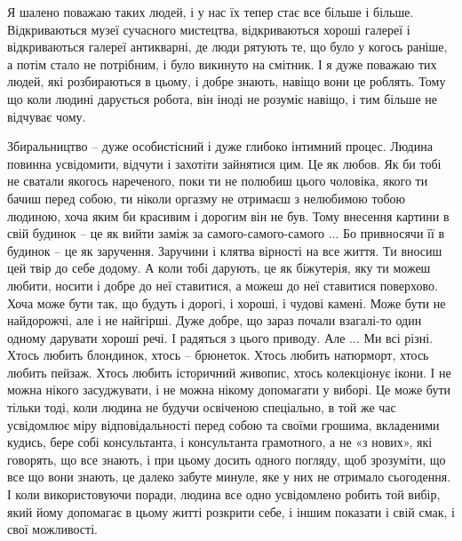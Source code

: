 Я шалено поважаю таких людей, і у нас їх тепер стає все більше і більше.
Відкриваються музеї сучасного мистецтва, відкриваються хороші галереї і
відкриваються галереї антикварні, де люди рятують те, що було у когось раніше,
а потім стало не потрібним, і було викинуто на смітник. І я дуже поважаю тих
людей, які розбираються в цьому, і добре знають, навіщо вони це роблять. Тому
що коли людині дарується робота, він іноді не розуміє навіщо, і тим більше не
відчуває чому.

Збиральництво – дуже особистісний і дуже глибоко інтимний процес. Людина
повинна усвідомити, відчути і захотіти зайнятися цим. Це як любов. Як би тобі
не сватали якогось нареченого, поки ти не полюбиш цього чоловіка, якого ти
бачиш перед собою, ти ніколи оргазму не отримаєш з нелюбимою тобою людиною,
хоча яким би красивим і дорогим він не був. Тому внесення картини в свій
будинок – це як вийти заміж за самого-самого-самого ... Бо привносячи її в
будинок – це як заручення. Заручини і клятва вірності на все життя. Ти вносиш
цей твір до себе додому. А коли тобі дарують, це як біжутерія, яку ти можеш
любити, носити і добре до неї ставитися, а можеш до неї ставитися поверхово.
Хоча може бути так, що будуть і дорогі, і хороші, і чудові камені. Може бути не
найдорожчі, але і не найгірші. Дуже добре, що зараз почали взагалі-то один
одному дарувати хороші речі. І радяться з цього приводу. Але ... Ми всі різні.
Хтось любить блондинок, хтось – брюнеток. Хтось любить натюрморт, хтось любить
пейзаж. Хтось любить історичний живопис, хтось колекціонує ікони. І не можна
нікого засуджувати, і не можна нікому допомагати у виборі. Це може бути тільки
тоді, коли людина не будучи освіченою спеціально, в той же час усвідомлює міру
відповідальності перед собою та своїми грошима, вкладеними кудись, бере собі
консультанта, і консультанта грамотного, а не «з нових», які говорять, що все
знають, і при цьому досить одного погляду, щоб зрозуміти, що все що вони
знають, це далеко забуте минуле, яке у них не отримало сьогодення. І коли
використовуючи поради, людина все одно усвідомлено робить той вибір, який йому
допомагає в цьому житті розкрити себе, і іншим показати і свій смак, і свої
можливості.

